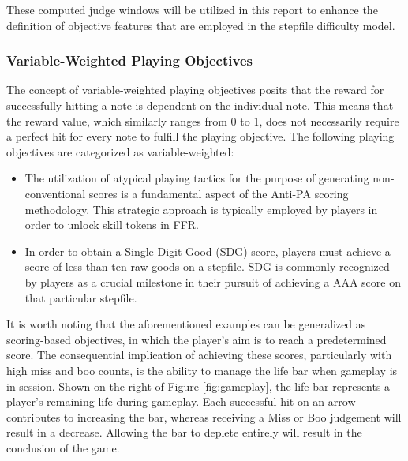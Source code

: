 \vspace{2mm}

These computed judge windows will be utilized in this report to enhance the definition of objective features that are employed in the stepfile difficulty model.

\subsubsection{Variable-Weighted Playing Objectives}

The concept of variable-weighted playing objectives posits that the reward for successfully hitting a note is dependent on the individual note. This means that the reward value, which similarly ranges from 0 to 1, does not necessarily require a perfect hit for every note to fulfill the playing objective. The following playing objectives are categorized as variable-weighted:

\begin{itemize}
    \item The utilization of atypical playing tactics for the purpose of generating non-conventional scores is a fundamental aspect of the Anti-PA scoring methodology. This strategic approach is typically employed by players in order to unlock \href{https://www.flashflashrevolution.com/tokens/skill_token_info.php}{skill tokens in FFR}.

    \item In order to obtain a Single-Digit Good (SDG) score, players must achieve a score of less than ten raw goods on a stepfile. SDG is commonly recognized by players as a crucial milestone in their pursuit of achieving a AAA score on that particular stepfile.
\end{itemize}

It is worth noting that the aforementioned examples can be generalized as scoring-based objectives, in which the player's aim is to reach a predetermined score. The consequential implication of achieving these scores, particularly with high miss and boo counts, is the ability to manage the life bar when gameplay is in session. Shown on the right of Figure \ref{fig:gameplay}, the life bar represents a player's remaining life during gameplay. Each successful hit on an arrow contributes to increasing the bar, whereas receiving a Miss or Boo judgement will result in a decrease. Allowing the bar to deplete entirely will result in the conclusion of the game.

